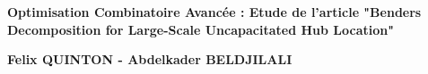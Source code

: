 
\begin{titlepage}
	\parindent=0pt
 
\addtolength{\wpXoffset}{-4.5cm}

	
	\hrulefill
	\begin{center}\bfseries\Huge
		\color{white}
		{Optimisation Combinatoire Avancée : Etude de l'article "Benders Decomposition for Large-Scale Uncapacitated Hub Location"} 
	\end{center}
	\hrulefill
	
	\vspace*{1cm}
	\begin{center}\bfseries\Large
			\color{white}
		{Felix QUINTON - Abdelkader BELDJILALI}
		
	\end{center}
	


\end{titlepage}
